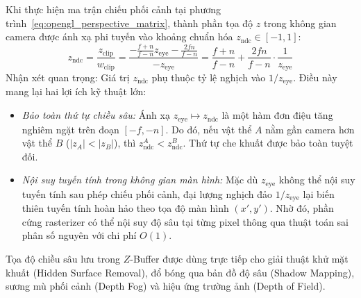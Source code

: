 Khi thực hiện ma trận chiếu phối cảnh tại phương trình~\eqref{eq:opengl_perspective_matrix}, thành phần tọa độ $z$ trong không gian camera được ánh xạ phi tuyến vào khoảng chuẩn hóa $z_{\text{ndc}} \in [-1, 1]$:
\begin{equation}
\label{eq:z_ndc_mapping}
z_{\text{ndc}} = \frac{z_{\text{clip}}}{w_{\text{clip}}} = \frac{-\frac{f+n}{f-n} z_{\text{eye}} - \frac{2fn}{f-n}}{-z_{\text{eye}}} = \frac{f+n}{f-n} + \frac{2fn}{f-n} \cdot \frac{1}{z_{\text{eye}}}
\end{equation}
Nhận xét quan trọng: Giá trị $z_{\text{ndc}}$ phụ thuộc tỷ lệ nghịch vào $1/z_{\text{eye}}$. Điều này mang lại hai lợi ích kỹ thuật lớn:
\begin{itemize}
    \item \textit{Bảo toàn thứ tự chiều sâu:} Ánh xạ $z_{\text{eye}} \mapsto z_{\text{ndc}}$ là một hàm đơn điệu tăng nghiêm ngặt trên đoạn $[-f, -n]$. Do đó, nếu vật thể $A$ nằm gần camera hơn vật thể $B$ ($|z_A| < |z_B|$), thì $z_{\text{ndc}}^A < z_{\text{ndc}}^B$. Thứ tự che khuất được bảo toàn tuyệt đối.
    \item \textit{Nội suy tuyến tính trong không gian màn hình:} Mặc dù $z_{\text{eye}}$ không thể nội suy tuyến tính sau phép chiếu phối cảnh, đại lượng nghịch đảo $1/z_{\text{eye}}$ lại biến thiên tuyến tính hoàn hảo theo tọa độ màn hình $(x', y')$. Nhờ đó, phần cứng rasterizer có thể nội suy độ sâu tại từng pixel thông qua thuật toán sai phân số nguyên với chi phí $O(1)$.
\end{itemize}
Tọa độ chiều sâu lưu trong $Z$-Buffer được dùng trực tiếp cho giải thuật khử mặt khuất (Hidden Surface Removal), đổ bóng qua bản đồ độ sâu (Shadow Mapping), sương mù phối cảnh (Depth Fog) và hiệu ứng trường ảnh (Depth of Field).


